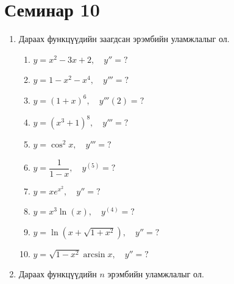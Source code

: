 \section{Семинар 10}
\begin{enumerate}
    \item Дараах функцүүдийн заагдсан эрэмбийн уламжлалыг ол.
\begin{enumerate}
  \item $y = x^2 - 3x + 2,\quad y'' = ?$
  \item $y=1-x^2-x^4, \quad y'''=?$
  \item $y=(1+x)^6, \quad y'''(2)=?$
  \item $y=(x^3+1)^8, \quad y'''=?$
  \item $y=\cos ^2 x, \quad y'''=?$
  \item $y=\dfrac{1}{1-x}, \quad y^{(5)}=?$
  \item $y = xe^{x^2},\quad y'' = ?$
  \item $y = x^3\ln(x),\quad y^{(4)} = ?$
  \item $y = \ln(x+\sqrt{1+x^2}),\quad y'' = ?$
  \item $y = \sqrt{1-x^2}\arcsin x,\quad y'' = ?$
\end{enumerate}
\item Дараах функцүүдийн $n$ эрэмбийн уламжлалыг ол.
\begin{enumerate}
   

\end{enumerate}
\end{enumerate}
